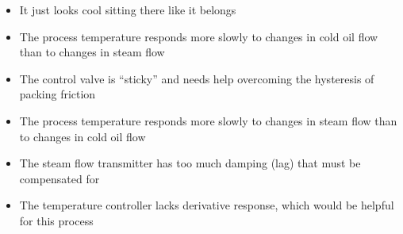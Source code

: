 \begin{itemize}
\item{} It just looks cool sitting there like it belongs 
\vskip 10pt 
\item{} The process temperature responds more slowly to changes in cold oil flow than to changes in steam flow 
\vskip 10pt 
\item{} The control valve is ``sticky'' and needs help overcoming the hysteresis of packing friction
\vskip 10pt 
\item{} The process temperature responds more slowly to changes in steam flow than to changes in cold oil flow
\vskip 10pt 
\item{} The steam flow transmitter has too much damping (lag) that must be compensated for
\vskip 10pt 
\item{} The temperature controller lacks derivative response, which would be helpful for this process
\end{itemize}




